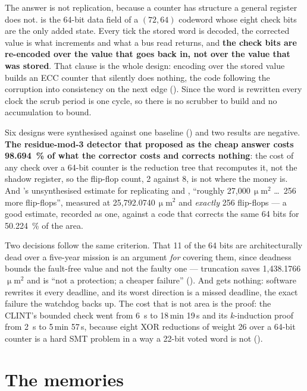 The answer is not replication, because a counter has structure a general
register does not.  is the 64-bit data field of a $(72,64)$
codeword whose eight check bits are the only added state. Every tick the
stored word is decoded, the corrected value is what increments and what
a bus read returns, and \textbf{the check bits are re-encoded over the
value that goes back in, not over the value that was stored}. That clause is the whole design: encoding over the stored
value builds an ECC counter that silently does nothing, the code
following the corruption into consistency on the next edge
(). Since the word is rewritten every clock the
scrub period is one cycle, so there is no scrubber to build and no
accumulation to bound.

Six designs were synthesised against one baseline
() and two results are negative. \textbf{The
residue-mod-3 detector that  proposed as the
cheap answer costs \SI{98.694}{\percent} of what the corrector costs and
corrects nothing}: the cost of any check over a 64-bit counter is the
reduction tree that recomputes it, not the shadow register, so the
flip-flop count, 2 against 8, is not where the money is. And
's unsynthesised estimate for replicating  and
, ``roughly 27{,}000\,$\upmu$m$^2$ \dots\ 256
more flip-flops'', measured at 25{,}792.0740\,$\upmu$m$^2$
and \emph{exactly} 256 flip-flops --- a good estimate, recorded as one,
against a code that corrects the same 64 bits for
\SI{50.224}{\percent} of the area.

Two decisions follow the same criterion. That 11 of the 64 bits are
architecturally dead over a five-year mission is an argument \emph{for}
covering them, since deadness bounds the fault-free value and not the
faulty one --- truncation saves 1{,}438.1766\,$\upmu$m$^2$ and
is ``not a protection; a cheaper failure''
(). And  gets nothing: software
rewrites it every deadline, and its worst direction is a missed
deadline, the exact failure the watchdog backs up. The cost that is not area is the proof: the CLINT's bounded check went from
\SI{6}{\second} to 18\,min 19\,s and its $k$-induction proof from
\SI{2}{\second} to 5\,min 57\,s, because eight XOR reductions of weight
26 over a 64-bit counter is a hard SMT problem in a way a 22-bit voted
word is not ().

\section{The memories}
\label{sec:harden-mem}


